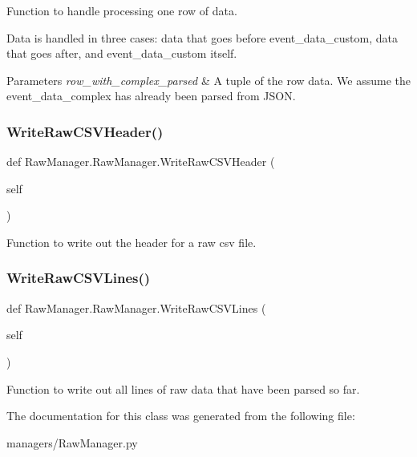 Function to handle processing one row of data. 

Data is handled in three cases\+: data that goes before event\+\_\+data\+\_\+custom, data that goes after, and event\+\_\+data\+\_\+custom itself. 
\begin{DoxyParams}{Parameters}
{\em row\+\_\+with\+\_\+complex\+\_\+parsed} & A tuple of the row data. We assume the event\+\_\+data\+\_\+complex has already been parsed from J\+S\+ON. \\
\hline
\end{DoxyParams}
\mbox{\label{class_raw_manager_1_1_raw_manager_af32f66ba9cb28dfebb2cf25ebfb84eee}} 
\subsubsection{\texorpdfstring{WriteRawCSVHeader()}{WriteRawCSVHeader()}}
{\footnotesize\ttfamily def Raw\+Manager.\+Raw\+Manager.\+Write\+Raw\+C\+S\+V\+Header (\begin{DoxyParamCaption}\item[{}]{self }\end{DoxyParamCaption})}



Function to write out the header for a raw csv file. 

\mbox{\label{class_raw_manager_1_1_raw_manager_ae4f7b4b222a87497737128143043159c}} 
\subsubsection{\texorpdfstring{WriteRawCSVLines()}{WriteRawCSVLines()}}
{\footnotesize\ttfamily def Raw\+Manager.\+Raw\+Manager.\+Write\+Raw\+C\+S\+V\+Lines (\begin{DoxyParamCaption}\item[{}]{self }\end{DoxyParamCaption})}



Function to write out all lines of raw data that have been parsed so far. 



The documentation for this class was generated from the following file\+:\begin{DoxyCompactItemize}
\item 
managers/Raw\+Manager.\+py\end{DoxyCompactItemize}
